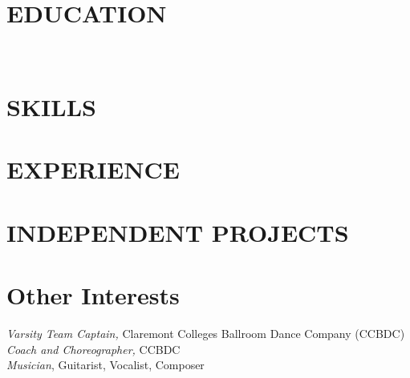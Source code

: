 \documentclass[margin, 10pt]{res} %
\begin{document}
\begin{resume}

\vspace{-1em}
\section{EDUCATION}
\\


\section{SKILLS}


\section{EXPERIENCE}




\section{INDEPENDENT PROJECTS}


\section{Other Interests}

\textit{Varsity Team Captain,} Claremont Colleges Ballroom Dance Company (CCBDC)  \\
\textit{Coach and Choreographer,} CCBDC\\
\textit{Musician}, Guitarist, Vocalist, Composer

\end{resume}
\end{document}
